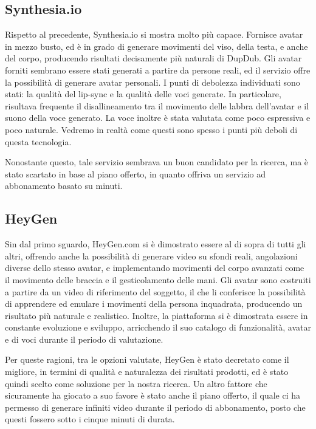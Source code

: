 \subsection{Synthesia.io}

Rispetto al precedente, Synthesia.io si mostra molto più capace. Fornisce avatar in mezzo busto, ed è in grado di generare movimenti del viso, della testa, e anche del corpo, producendo risultati decisamente più naturali di DupDub. Gli avatar forniti sembrano essere stati generati a partire da persone reali, ed il servizio offre la possibilità di generare avatar personali. I punti di debolezza individuati sono stati: la qualità del lip-sync e la qualità delle voci generate. In particolare, risultava frequente il disallineamento tra il movimento delle labbra dell'avatar e il suono della voce generato. La voce inoltre è stata valutata come poco espressiva e poco naturale. Vedremo in realtà come questi sono spesso i punti più deboli di questa tecnologia.

Nonostante questo, tale servizio sembrava un buon candidato per la ricerca, ma è stato scartato in base al piano offerto, in quanto offriva un servizio ad abbonamento basato su minuti. %

\subsection{HeyGen}

Sin dal primo sguardo, HeyGen.com si è dimostrato essere al di sopra di tutti gli altri, offrendo anche la possibilità di generare video su sfondi reali, angolazioni diverse dello stesso avatar, e implementando movimenti del corpo avanzati come il movimento delle braccia e il gesticolamento delle mani. Gli avatar sono costruiti a partire da un video di riferimento del soggetto, il che li conferisce la possibilità di apprendere ed emulare i movimenti della persona inquadrata, producendo un risultato più naturale e realistico. Inoltre, la piattaforma si è dimostrata essere in constante evoluzione e sviluppo, arricchendo il suo catalogo di funzionalità, avatar e di voci durante il periodo di valutazione.

Per queste ragioni, tra le opzioni valutate, HeyGen è stato decretato come il migliore, in termini di qualità e naturalezza dei risultati prodotti, ed è stato quindi scelto come soluzione per la nostra ricerca. Un altro fattore che sicuramente ha giocato a suo favore è stato anche il piano offerto, il quale ci ha permesso di generare infiniti video durante il periodo di abbonamento, posto che questi fossero sotto i cinque minuti di durata.

